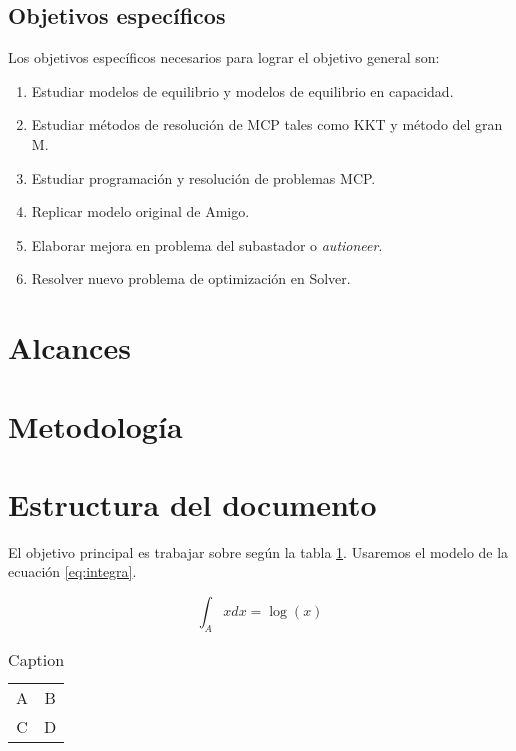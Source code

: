 \subsection{Objetivos específicos}
Los objetivos específicos necesarios para lograr el objetivo general son:

\begin{enumerate}
\item Estudiar modelos de equilibrio y modelos de equilibrio en capacidad.
\item Estudiar métodos de resolución de MCP tales como KKT y método del gran M.
\item Estudiar programación y resolución de problemas MCP.
\item Replicar modelo original de Amigo.
\item Elaborar mejora en problema del subastador o \textit{autioneer}.
\item Resolver nuevo problema de optimización en Solver.
\end{enumerate}


\section{Alcances}

\section{Metodología}
\section{Estructura del documento}


El objetivo principal es trabajar sobre \cite{amigo_two_2021} según la tabla \ref{tab:desc}. Usaremos el modelo de la ecuación \ref{eq:integra}.



\begin{equation}
    \int_A xdx=\log(x)\label{eq:integra}
\end{equation}

\begin{table}[h!]
    \centering
    \begin{tabular}{c|c}
        A & B \\
        C & D
    \end{tabular}
    \caption{Caption}
    \label{tab:desc}
\end{table}


